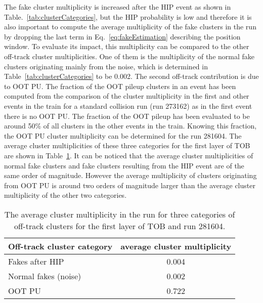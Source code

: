 The fake cluster multiplicity is increased after the HIP event as shown in Table.~\ref{tab:clusterCategories}, but the HIP probability is low and therefore it is also important to compute the average multiplicity of the fake clusters in the run by dropping the last term in Eq.~\ref{eq:fakeEstimation} describing the position window. To evaluate its impact, this multiplicity can be compared to the other off-track cluster multiplicities. One of them is the multiplicity of the normal fake clusters originating mainly from the noise, which is determined in Table~\ref{tab:clusterCategories} to be 0.002. The second off-track contribution is due to OOT PU. The fraction of the OOT pileup clusters in an event has been computed from the comparison of the cluster multiplicity in the first and other events in the train for a standard collision run (run 273162) as in the first event there is no OOT PU. The fraction of the OOT pileup has been evaluated to be around 50\% of all clusters in the other events in the train. Knowing this fraction, the OOT PU cluster multiplicity can be determined for the run 281604. The average cluster multiplicities of these three categories for the first layer of TOB are shown in Table~\ref{tab:multFake}. It can be noticed that the average cluster multiplicities of normal fake clusters and fake clusters resulting from the HIP event are of the same order of magnitude. However the average multiplicity of clusters originating from OOT PU is around two orders of magnitude larger than the  average cluster multiplicity of the other two categories.  


\begin{table}[h]
\begin{center}
\begin{tabular}{|l|c|}
\hline
Off-track cluster category & average cluster multiplicity \\
\hline
Fakes after HIP & 0.004  \\
Normal fakes (noise) & 0.002  \\
OOT PU & 0.722 \\
\hline
\end{tabular}
\caption[Table caption text]{The average cluster multiplicity in the run for three categories of off-track clusters for the first layer of TOB and run 281604. }
\label{tab:multFake}
\end{center}
\end{table}



